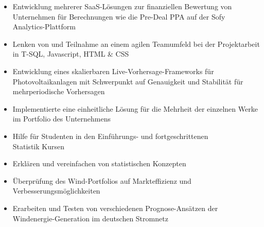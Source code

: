 \documentclass[9pt,a4paper,ragged2e]{altacv}
\begin{document}
    \medskip\medskip\medskip


    \begin{itemize}
        \item Entwicklung mehrerer SaaS-Lösungen zur finanziellen Bewertung von \\ Unternehmen für Berechnungen wie die Pre-Deal PPA auf der Sofy \\ Analytics-Plattform
        \item Lenken von und Teilnahme an einem agilen Teamumfeld bei der Projektarbeit in T-SQL, Javascript, HTML \& CSS
    \end{itemize}

    \divider

    \begin{itemize}
        \item Entwicklung eines skalierbaren Live-Vorhersage-Frameworks für \\ Photovoltaikanlagen mit Schwerpunkt auf Genauigkeit und Stabilität für mehrperiodische Vorhersagen
        \item Implementierte eine einheitliche Lösung für die Mehrheit der einzelnen Werke im Portfolio des Unternehmens
    \end{itemize}

    \divider

    \begin{itemize}
        \item Hilfe für Studenten in den Einführungs- und fortgeschrittenen \\ Statistik Kursen
        \item Erklären und vereinfachen von statistischen Konzepten
    \end{itemize}

    \divider

    \begin{itemize}
        \item Überprüfung des Wind-Portfolios auf Markteffizienz und \\ Verbesserungsmöglichkeiten
        \item Erarbeiten und Testen von verschiedenen Prognose-Ansätzen der Windenergie-Generation im deutschen Stromnetz
    \end{itemize}
\end{document}
